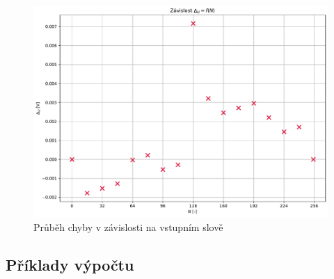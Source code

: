 \documentclass[a4paper, czech]{article}
\begin{document}
\begin{figure}[H]
    \centering
    \includegraphics[width=\textwidth]{grafy/graf2.pdf}
    \caption{Průběh chyby v závislosti na vstupním slově} 
\end{figure}

\subsection{Příklady výpočtu}
\end{document}

